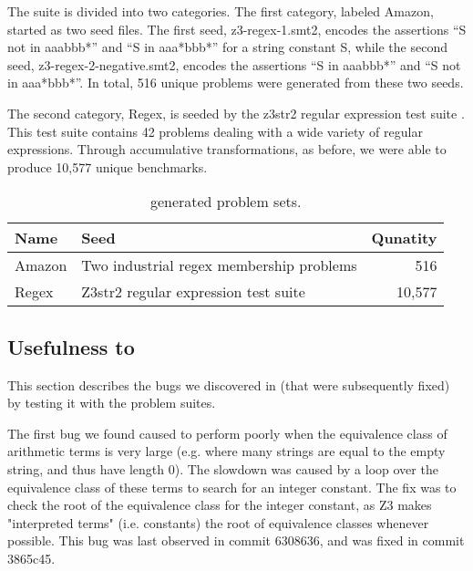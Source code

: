     The suite is divided into two categories. The first category, labeled Amazon, started as two seed files.
    The first seed, z3-regex-1.smt2, encodes the assertions ``S not in aaabbb*'' and ``S in aaa*bbb*'' for a string constant S,
    while the second seed, z3-regex-2-negative.smt2, encodes the assertions ``S in aaabbb*'' and ``S not in aaa*bbb*''. 
    In total, 516 unique problems were generated from these two seeds.
    
    The second category, Regex, is seeded by the z3str2 regular expression test suite \cite{} . This test suite contains 42 problems dealing with a wide variety of regular expressions.
    Through accumulative transformations, as before, we were able to produce 10,577 unique benchmarks.

    \begin{table}
    \begin{tabular}{|l|l|r|}
        \hline
        \textbf{Name} & \textbf{Seed}                            & \textbf{Qunatity} \\ \hline
        Amazon        & Two industrial regex membership problems & 516\\ \hline
        Regex         & Z3str2 regular expression test suite     & 10,577\\ \hline
    \end{tabular}
    \caption{\transformer{} generated problem sets.}
    \label{tbl:transformed}
    \end{table}

    \subsection{Usefulness to \us{}}

        This section describes the bugs we discovered in \us{} (that were subsequently fixed) by testing it with the \fuzzer{} problem suites.

        The first bug we found caused \us{} to perform poorly when the equivalence class of arithmetic terms is very large (e.g. where many strings are equal to the empty string, and thus have length 0). The slowdown was caused by a loop over the equivalence class of these terms to search for an integer constant. The fix was to check the root of the equivalence class for the integer constant, as Z3 makes "interpreted terms" (i.e. constants) the root of equivalence classes whenever possible. This bug was last observed in commit 6308636, and was fixed in commit 3865c45.

